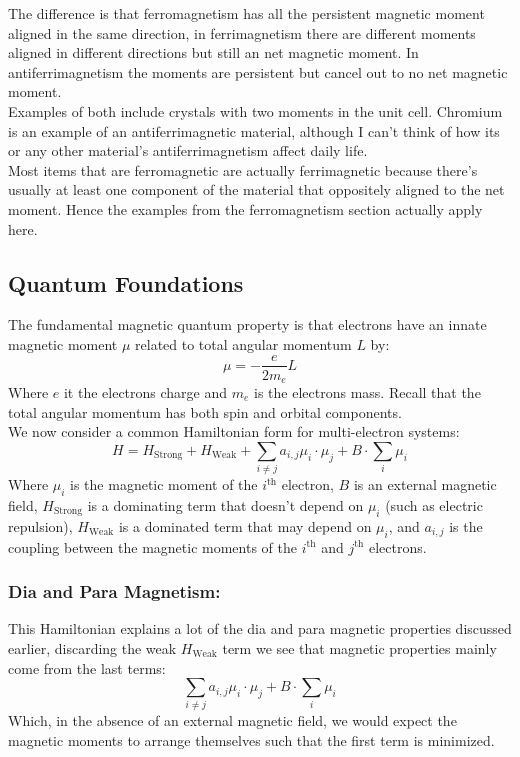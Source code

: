 The difference is that ferromagnetism has all the persistent magnetic moment aligned in the same direction,
in ferrimagnetism there are different moments aligned in different directions but still an net magnetic moment.
In antiferrimagnetism the moments are persistent but cancel out to no net magnetic moment.
\\

Examples of both include crystals with two moments in the unit cell.
Chromium is an example of an antiferrimagnetic material,
although I can't think of how its or any other material's antiferrimagnetism affect daily life.
\\

Most items that are ferromagnetic are actually ferrimagnetic because there's usually at least one component of the material that oppositely aligned to the net moment.
Hence the examples from the ferromagnetism section actually apply here. 

\subsection{Quantum Foundations}
The fundamental magnetic quantum property is that electrons have an innate magnetic moment $\mu$ related to total angular momentum $L$ by:
\[\mu = -\frac{e}{2m_e}L\]
Where $e$ it the electrons charge and $m_e$ is the electrons mass.
Recall that the total angular momentum has both spin and orbital components.
\\

We now consider a common Hamiltonian form for multi-electron systems:
\[H = H_\text{Strong} + H_\text{Weak} + \sum_{i\neq j}a_{i,j}\mu_i\cdot \mu_j +B\cdot\sum_i\mu_i\]
Where $\mu_i$ is the magnetic moment of the $i^\text{th}$ electron,
$B$ is an external magnetic field,
$H_\text{Strong}$ is a dominating term that doesn't depend on $\mu_i$ (such as electric repulsion),
$H_\text{Weak}$ is a dominated term that may depend on $\mu_i$,
and $a_{i,j}$ is the coupling between the magnetic moments of the $i^\text{th}$ and $j^\text{th}$ electrons.

\subsubsection{Dia and Para Magnetism:}
This Hamiltonian explains a lot of the dia and para magnetic properties discussed earlier,
discarding the weak $H_\text{Weak}$ term we see that magnetic properties mainly come from the last terms:
\[\sum_{i\neq j}a_{i,j}\mu_i\cdot \mu_j +B\cdot\sum_i\mu_i\]
Which,
in the absence of an external magnetic field,
we would expect the magnetic moments to arrange themselves such that the first term is minimized.
\\

